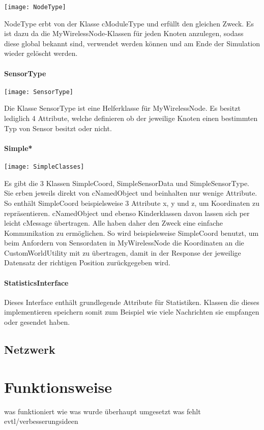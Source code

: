 \begin{center}
\texttt{[image: NodeType]}
\end{center}

NodeType erbt von der Klasse cModuleType und erfüllt den gleichen Zweck. Es ist dazu da die MyWirelessNode-Klassen für jeden Knoten anzulegen, sodass diese global bekannt sind, verwendet werden können und am Ende der Simulation wieder gelöscht werden.

\paragraph{SensorType}

\begin{center}
\texttt{[image: SensorType]}
\end{center}

Die Klasse SensorType ist eine Helferklasse für MyWirelessNode. Es besitzt lediglich 4 Attribute, welche definieren ob der jeweilige Knoten einen bestimmten Typ von Sensor besitzt oder nicht.

\paragraph{Simple*}

\begin{center}
\texttt{[image: SimpleClasses]}
\end{center}

Es gibt die 3 Klassen SimpleCoord, SimpleSensorData und SimpleSensorType.  Sie erben jeweils direkt von cNamedObject und beinhalten nur wenige Attribute. So enthält SimpleCoord beispielsweise 3 Attribute x, y und z, um Koordinaten zu repräsentieren.\newline
cNamedObject und ebenso Kinderklassen davon lassen sich per leicht cMessage übertragen. Alle haben daher den Zweck eine einfache Kommunikation zu ermöglichen. So wird beispielsweise SimpleCoord benutzt, um beim Anfordern von Sensordaten in MyWirelessNode die Koordinaten an die CustomWorldUtility mit zu übertragen, damit in der Response der jeweilige Datensatz der richtigen Position zurückgegeben wird.

\paragraph{StatisticsInterface}

Dieses Interface enthält grundlegende Attribute für Statistiken. Klassen die dieses implementieren speichern somit zum Beispiel wie viele Nachrichten sie empfangen oder gesendet haben.

\subsection{Netzwerk}



\section{Funktionsweise}

was funktioniert wie
was wurde überhaupt umgesetzt
was fehlt evtl/verbesserungsideen